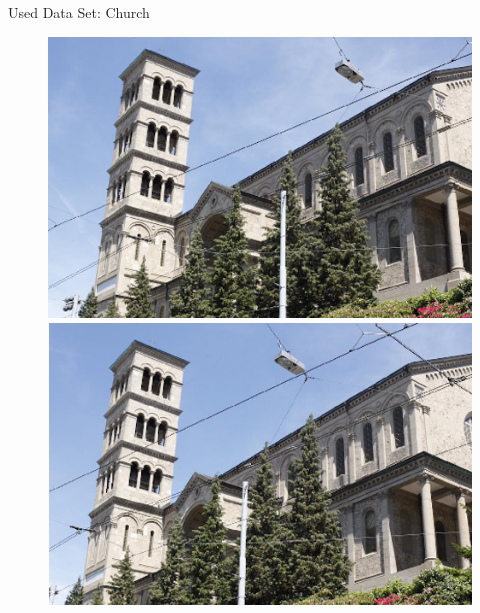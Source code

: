 \begin{frame}{Used Data Set: Church}
\begin{figure}[!tbp]
  \centering
  \begin{minipage}[b]{0.49\textwidth}
    \includegraphics[width=\textwidth]{../../Diagrams/first_frame_church.png}
  \end{minipage}
	\pause
  \begin{minipage}[b]{0.5\textwidth}
    \includegraphics[width=\textwidth]{../../Diagrams/last_frame_church.png}
  \end{minipage}
\end{figure}
\end{frame}

